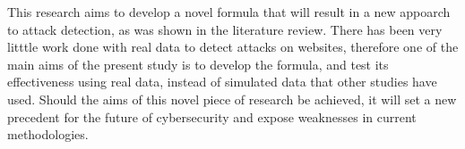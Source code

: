 
This research aims to develop a novel formula that will result in a new appoarch to attack detection, as was shown in the literature review. There has been very litttle work done with real data to detect attacks on websites, therefore one of the main aims of the present study is to develop the formula, and test its effectiveness using real data, instead of simulated data that other studies have used. Should the aims of this novel piece of research be achieved, it will set a new precedent for the future of cybersecurity and expose weaknesses in current methodologies.